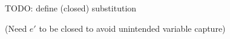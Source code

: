\documentclass{article}
\let\originalleft\left
\let\originalright\right
\renewcommand{\left}{\mathopen{}\mathclose\bgroup\originalleft}
\renewcommand{\right}{\aftergroup\egroup\originalright}
\begin{document}

TODO: define (closed) substitution

(Need $e'$ to be closed to avoid unintended variable capture)
\end{document}

